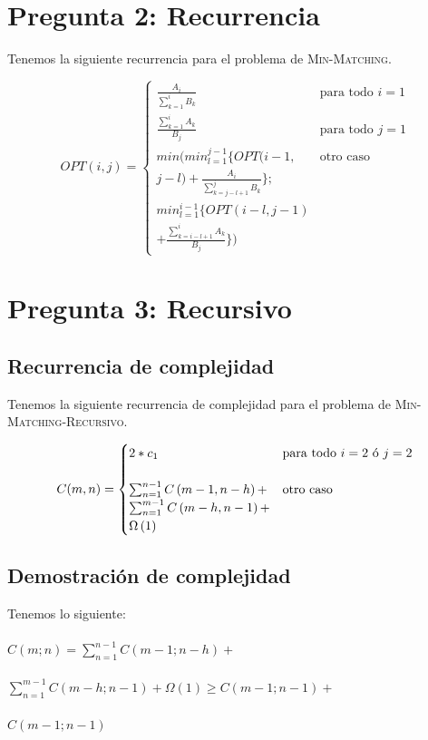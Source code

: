 \documentclass[conference]{IEEEtran}
\begin{document}
\section{Pregunta 2: Recurrencia}
Tenemos la siguiente recurrencia para el problema de \textsc{Min-Matching}.
\begin{center}
\[ OPT(i,j) =
   \begin{cases}
     \frac{A_i}{\sum _{k=1}^iB_k} & \text{para todo $i=1$} \\
     \frac{\sum _{k=1}^iA_k}{B_j} & \text{para todo $j=1$} \\
     min(min_{l=1}^{j-1}\{OPT(i-1, & \text{otro caso} \\
     j-l)+\frac{A_i}{\sum _{k=j-l+1}^jB_k}\}; & \\
     min_{l=1}^{i-1}\{OPT(i-l,j-1) & \\
     +\frac{\sum _{k=i-l+1}^iA_k}{B_j}\}) &
   \end{cases}
\]
\end{center}
\section{Pregunta 3: Recursivo}
\subsection{Recurrencia de complejidad}
Tenemos la siguiente recurrencia de complejidad para el problema de \textsc{Min-Matching-Recursivo}.\\
\begin{center}
\[ C(m,n) =
   \begin{cases}
     2*c_1 & \text{para todo $i=2$ \text{ó} $j=2$} \\\\
     \sum _{n=1}^{n-1}C\left(m-1,n-h\right)+ & \text{otro caso} \\
     \sum _{n=1}^{m-1}C\left(m-h,n-1\right)+ & \\
     \Omega \left(1\right) & 
   \end{cases}
\]
\end{center}

\subsection{Demostración de complejidad}
Tenemos lo siguiente:\\\\
$C\left(m;n\right)=\sum _{n=1}^{n-1}C\left(m-1;n-h\right)+$\\\\
$\sum _{n=1}^{m-1}C\left(m-h;n-1\right)+\Omega \left(1\right)\ge C\left(m-1;n-1\right)+$\\\\
$C\left(m-1;n-1\right)$\\
\end{document}
